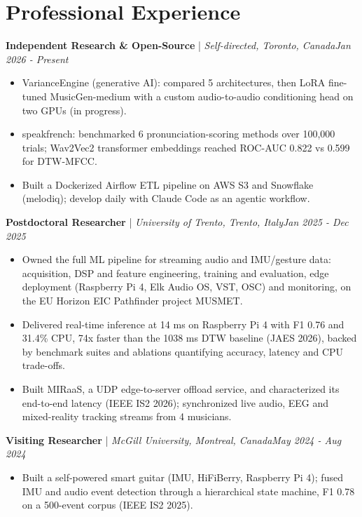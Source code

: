 \documentclass[11pt]{article}
\newenvironment{cvrole}[5]{%
  \par\noindent\textbf{\large #1} | \textit{\small #2, #3}\hfill \textit{\small #4 - #5}\par
  \begin{itemize}[leftmargin=2em, itemsep=-0.3em, topsep=-0.5em]%
}{%
  \end{itemize}\par\noindent\mbox{}\par\vspace{0.1em}%
}
\begin{document}
\section*{Professional Experience}

\begin{cvrole}{Independent Research \& Open-Source}{Self-directed}{Toronto, Canada}{Jan 2026}{Present}
    \item VarianceEngine (generative AI): compared 5 architectures, then LoRA fine-tuned MusicGen-medium with a custom audio-to-audio conditioning head on two GPUs (in progress).
    \item speakfrench: benchmarked 6 pronunciation-scoring methods over 100,000 trials; Wav2Vec2 transformer embeddings reached ROC-AUC 0.822 vs 0.599 for DTW-MFCC.
    \item Built a Dockerized Airflow ETL pipeline on AWS S3 and Snowflake (melodiq); develop daily with Claude Code as an agentic workflow.
\end{cvrole}

\begin{cvrole}{Postdoctoral Researcher}{University of Trento}{Trento, Italy}{Jan 2025}{Dec 2025}
    \item Owned the full ML pipeline for streaming audio and IMU/gesture data: acquisition, DSP and feature engineering, training and evaluation, edge deployment (Raspberry Pi 4, Elk Audio OS, VST, OSC) and monitoring, on the EU Horizon EIC Pathfinder project MUSMET.
    \item Delivered real-time inference at 14 ms on Raspberry Pi 4 with F1 0.76 and 31.4\% CPU, 74x faster than the 1038 ms DTW baseline (JAES 2026), backed by benchmark suites and ablations quantifying accuracy, latency and CPU trade-offs.
    \item Built MIRaaS, a UDP edge-to-server offload service, and characterized its end-to-end latency (IEEE IS2 2026); synchronized live audio, EEG and mixed-reality tracking streams from 4 musicians.
\end{cvrole}

\begin{cvrole}{Visiting Researcher}{McGill University}{Montreal, Canada}{May 2024}{Aug 2024}
    \item Built a self-powered smart guitar (IMU, HiFiBerry, Raspberry Pi 4); fused IMU and audio event detection through a hierarchical state machine, F1 0.78 on a 500-event corpus (IEEE IS2 2025).
\end{cvrole}
\end{document}
